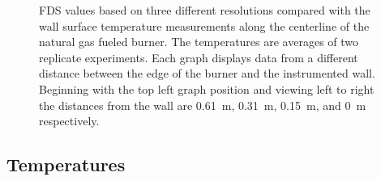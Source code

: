 \documentclass[twoside]{uocthesis}
\begin{document}
\begin{figure}[ht!]
  \caption[FDS values based on three different resolutions compared with the wall surface temperature measurements along the centerline of the natural gas fueled burner]{FDS values based on three different resolutions compared with the wall surface temperature measurements along the centerline of the natural gas fueled burner. The temperatures are averages of two replicate experiments. Each graph displays data from a different distance between the edge of the burner and the instrumented wall.  Beginning with the top left graph position and viewing left to right the distances from the wall are 0.61~m, 0.31~m, 0.15~m, and 0~m respectively.}
  \label{FDS_Wall_Temp_TWNG_comp}
\end{figure}







\subsection{Temperatures}
\end{document}
